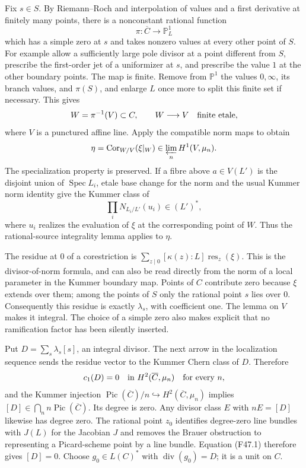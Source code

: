 Fix $s\in S$. By Riemann--Roch and interpolation of values and a
first derivative at finitely many points, there is a nonconstant
rational function
\[
 \pi:\overline C\longrightarrow\mathbb P^1_L
\]
which has a simple zero at $s$ and takes nonzero values at every
other point of $S$. For example allow a sufficiently large pole
divisor at a point different from $S$, prescribe the first-order
jet of a uniformizer at $s$, and prescribe the value $1$ at the
other boundary points. The map is finite. Remove from $\mathbb P^1$
the values $0,\infty$, its branch values, and $\pi(S)$, and enlarge
$L$ once more to split this finite set if necessary. This gives
\[
 W=\pi^{-1}(V)\subset C,\qquad W\longrightarrow V
 \quad\hbox{finite etale},
\]
where $V$ is a punctured affine line. Apply the compatible norm
maps to obtain
\[
 \eta=\operatorname{Cor}_{W/V}(\xi|_W)
        \in\varprojlim_n H^1(V,\mu_n).
\]
The specialization property is preserved. If a fibre above
$a\in V(L')$ is the disjoint union of $\operatorname{Spec}L_i$,
etale base change for the norm and the usual Kummer norm identity
give the Kummer class of
\[
        \prod_i N_{L_i/L'}(u_i)\in(L')^*,
\]
where $u_i$ realizes the evaluation of $\xi$ at the corresponding
point of $W$. Thus the rational-source integrality lemma applies to
$\eta$.

The residue at $0$ of a corestriction is
$\sum_{z\mid0}[\kappa(z):L]\operatorname{res}_z(\xi)$.
This is the divisor-of-norm formula, and can also be read directly
from the norm of a local parameter in the Kummer boundary map.
Points of $C$ contribute zero because $\xi$ extends over them;
among the points of $S$ only the rational point $s$ lies over $0$.
Consequently this residue is exactly $\lambda_s$, with coefficient
one. The lemma on $V$ makes it integral. The choice of a simple
zero also makes explicit that no ramification factor has been
silently inserted.

Put $D=\sum_s\lambda_s[s]$, an integral divisor. The next arrow in
the localization sequence sends the residue vector to the Kummer
Chern class of $D$. Therefore
\[
 c_1(D)=0\quad\hbox{in }H^2(\overline C,\mu_n)
       \quad\hbox{for every }n,
\]
and the Kummer injection
$\operatorname{Pic}(\overline C)/n\hookrightarrow
H^2(\overline C,\mu_n)$ implies
$[D]\in\bigcap_n n\operatorname{Pic}(\overline C)$.
Its degree is zero. Any divisor class $E$ with $nE=[D]$ likewise
has degree zero. The rational point $z_0$ identifies degree-zero
line bundles with $J(L)$ for the Jacobian $J$ and removes the
Brauer obstruction to representing a Picard-scheme point by a line
bundle. Equation (F47.1) therefore gives $[D]=0$.
Choose $g_0\in L(C)^*$ with $\operatorname{div}(g_0)=D$;
it is a unit on $C$.

